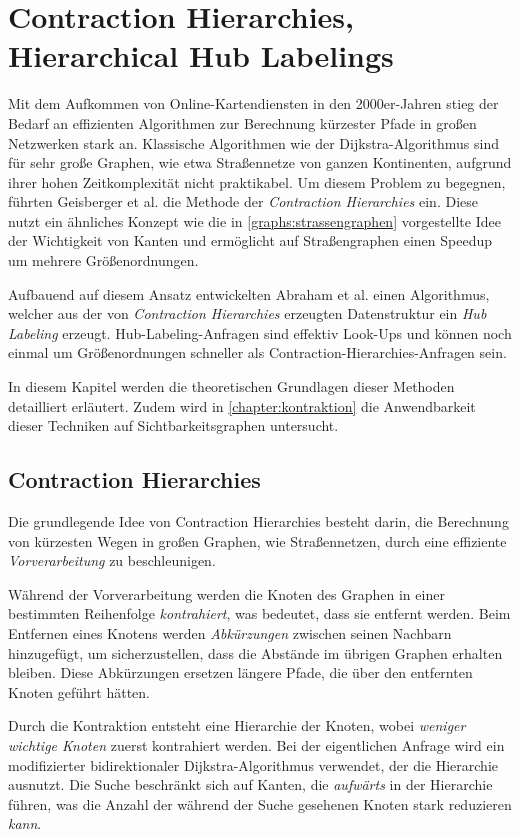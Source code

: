 \chapter{Contraction Hierarchies, Hierarchical Hub Labelings}\label{chapter:ch}

Mit dem Aufkommen von Online-Kartendiensten in den 2000er-Jahren stieg der Bedarf an effizienten Algorithmen zur Berechnung kürzester Pfade in großen Netzwerken stark an.
Klassische Algorithmen wie der Dijkstra-Algorithmus sind für sehr große Graphen, wie etwa Straßennetze von ganzen Kontinenten, aufgrund ihrer hohen Zeitkomplexität nicht praktikabel.
Um diesem Problem zu begegnen, führten Geisberger et al. \cite{geisberger2008contraction} die Methode der \emph{Contraction Hierarchies} ein.
Diese nutzt ein ähnliches Konzept wie die in \autoref{graphs:strassengraphen} vorgestellte Idee der Wichtigkeit von Kanten und ermöglicht auf Straßengraphen einen Speedup um mehrere Größenordnungen.

Aufbauend auf diesem Ansatz entwickelten Abraham et al. \cite{abraham2011hub} einen Algorithmus, welcher aus der von \emph{Contraction Hierarchies} erzeugten Datenstruktur ein \emph{Hub Labeling} erzeugt.
Hub-Labeling-Anfragen sind effektiv Look-Ups und können noch einmal um Größenordnungen schneller als Contraction-Hierarchies-Anfragen sein.

In diesem Kapitel werden die theoretischen Grundlagen dieser Methoden detailliert erläutert.
Zudem wird in \autoref{chapter:kontraktion}  die Anwendbarkeit dieser Techniken auf Sichtbarkeitsgraphen untersucht.

\section{Contraction Hierarchies}

Die grundlegende Idee von Contraction Hierarchies besteht darin, die Berechnung von kürzesten Wegen in großen Graphen, wie Straßennetzen, durch eine effiziente \emph{Vorverarbeitung} zu beschleunigen.

Während der Vorverarbeitung werden die Knoten des Graphen in einer bestimmten Reihenfolge \emph{kontrahiert}, was bedeutet, dass sie entfernt werden.
Beim Entfernen eines Knotens werden \emph{Abkürzungen} zwischen seinen Nachbarn hinzugefügt, um sicherzustellen, dass die Abstände im übrigen Graphen erhalten bleiben.
Diese Abkürzungen ersetzen längere Pfade, die über den entfernten Knoten geführt hätten.

Durch die Kontraktion entsteht eine Hierarchie der Knoten, wobei \emph{weniger wichtige Knoten} zuerst kontrahiert werden.
Bei der eigentlichen Anfrage wird ein modifizierter bidirektionaler Dijkstra-Algorithmus verwendet, der die Hierarchie ausnutzt.
Die Suche beschränkt sich auf Kanten, die \emph{aufwärts} in der Hierarchie führen, was die Anzahl der während der Suche gesehenen Knoten stark reduzieren \emph{kann}.

